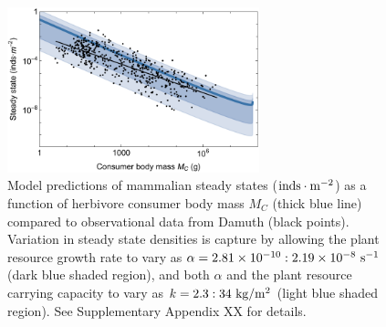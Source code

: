 \documentclass[]{rsos}%
\begin{document}
\begin{table}[h]
\begin{center}
\begin{tabular}{lll}
       
       
    
       \hline
        \end{tabular}
        \end{center}
       \end{table}
    
    


\clearpage


\begin{figure}
\centering
\includegraphics[width=0.65\textwidth]{fig_consumer2d_resources.pdf}
\caption{Model predictions of mammalian steady states ($\rm inds\cdot m^{-2}$) as a function of herbivore consumer body mass $M_C$ (thick blue line) compared to observational data from Damuth \cite{Damuth1987} (black points).
Variation in steady state densities is capture by allowing the plant resource growth rate to vary as $\alpha = 2.81\times 10^{-10}: 2.19\times 10^{-8}~{\rm s}^{-1}$ (dark blue shaded region), and both $\alpha$ and the plant resource carrying capacity to vary as $k = 2.3:34~{\rm kg/m}{}^2$ (light blue shaded region).
See Supplementary Appendix XX for details.
}
\label{fig:2ddensities}
\end{figure}
\end{document}
